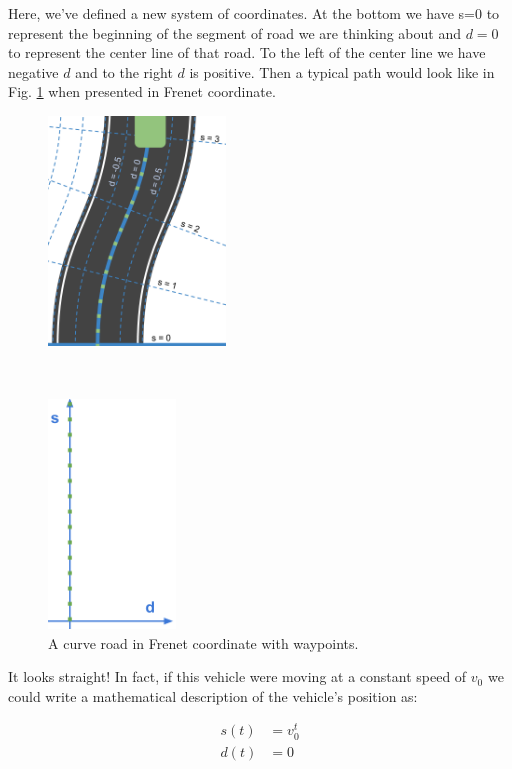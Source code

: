 Here, we've defined a new system of coordinates. At the bottom we have s=0 to represent the beginning of the segment of road we are thinking about and $d=0$ to represent the center line of that road. To the left of the center line we have negative $d$ and to the right $d$ is positive. Then a typical path would look like in Fig. \ref{fig:curve-in-frenet-wp} when presented in Frenet coordinate.

\begin{figure}[h]
  \centering
    \begin{minipage}{.5\textwidth}
        \centering
        \includegraphics[height=2.4in]{figs/ch3/curve-in-frenet-with-waypoints}
    \end{minipage}
    ~
    \begin{minipage}{.5\textwidth}
       \centering
      \includegraphics[height=2.4in]{figs/ch3/waypoints-in-frenet}
     \end{minipage}
\caption{A curve road in Frenet coordinate with waypoints.}
\label{fig:curve-in-frenet-wp}
\end{figure}

It looks straight! In fact, if this vehicle were moving at a constant speed of $v_0$ we could write a mathematical description of the vehicle's position as:

\begin{subequations} \label{eq:math-in-frenet}
\begin{align}
s(t) &= v_0^t \\
d(t) &= 0
\end{align}
\end{subequations}

